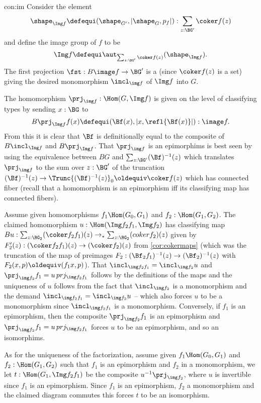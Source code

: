 \begin{implementation}{con:im}
  Consider the element
  $$\shape_{\Img f}\defequi (\shape_{G'},|\shape_G,p_f|):\sum_{z:\BG'}\coker f(z)$$ and define the image group of $f$ to be
  $$\Img f\defequi \aut_{\sum_{z:\BG'}\coker f(z)}(\shape_{\Img f}).$$
  The first projection $\fst: B\image f\to \BG'$ is a \covering
  (since $\coker f(z)$ is a set) giving the desired monomorphism $\incl_{\img f}$ of $\Img f$ into $G$.

  The homomorphism
  $\prj_{\img f}:\Hom(G,\Img f)$  is given on the level of classifying types by sending $x:\BG$ to
  $$B\prj_{\Img f} f(x)\defequi (\Bf(x),|x,\refl{\Bf(x)}|):\image f.$$
  From this it is clear that $\Bf$ is definitionally equal to the composite of $B\incl_{\Img f}$ and $B\prj_{\Img f}$.
  That $\prj_{\img f}$ is an epimorphims is best seen by using the equivalence between $BG$ and $\sum_{z:\BG'}(\Bf)^{-1}(z)$ which translates $\prj_{\img f}$ to the sum over $z:\BG'$ of the truncation $(\Bf)^{-1}(z)\to\Trunc{(\Bf)^{-1}(z)}_0\oldequiv\coker f(z)$ which has connected fiber (recall that a homomorphism is an epimorphism iff its classifying map has connected fibers).

  Assume given homomorphisms $f_1\Hom(G_0,G_1)$ and $f_2:\Hom(G_1,G_2)$.  The claimed homomorphism $u:\Hom(\Img f_2f_1,\Img f_2)$ has classifying map $Bu:\sum_{z:\BG_2}(\coker f_2f_1)(z)\to_*\sum_{z:\BG_2}(coker f_2)(z)$ given by $F_2'(z):(\coker f_2f_1)(z)\to(\coker f_2)(z)$ from \cref{cor:cokermaps} (which was the truncation of the map of preimages $F_2:(\Bf_2f_1)^{-1}(z)\to(\Bf_2)^{-1}(z)$ with $F_2(x,p)\oldequiv(f_1x,p)$).  That $\incl_{\img f_2f_1}=\incl_{\img f_2}u$ and $\prj_{\img f_2}f_1=u\,prj_{\img f_2f_1}$ follows by the definitions of the maps and the uniqueness of $u$ follows from the fact that $\incl_{\img f_2}$ is a monomorphism and the demand $\incl_{\img f_2f_1}=\incl_{\img f_2}u$ -- which also forces $u$ to be a monomorphism since $\incl_{\img f_2f_1}$ is a monomorphism.  Conversely, if $f_1$ is an epimorphism, then the composite $\prj_{\img f_2}f_1$ is an epimorphism and $\prj_{\img f_2}f_1=u\,prj_{\img f_2f_1}$ forces $u$ to be an epimorphism, and so an isomorphims.

  As for the uniqueness of the factorization, assume given $f_1\Hom(G_0,G_1)$ and $f_2:\Hom(G_1,G_2)$ such that $f_1$ is an epimorphism and $f_2$ in a monomorphism, we let $t:\Hom(G_1,\Img f_2f_1)$ be the composite $u^{-1}\prj_{\img f_2}$, where $u$ is invertible since $f_1$ is an epimorphism.  Since $f_1$ is an epimorphism, $f_2$ a monomorphism and the claimed diagram commutes this forces $t$ to be an isomorphism. %

\end{implementation}

